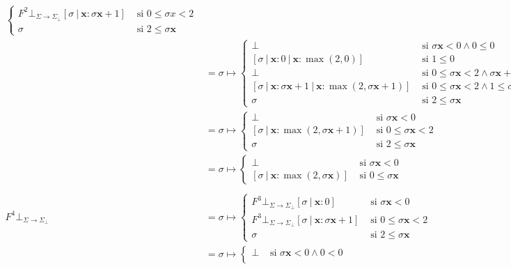 \documentclass{article}
\newcommand{\x}{\textbf{x}}
\newcommand{\cdom}{\Sigma \to \Sigma_\bot}
\newcommand{\cfbot}{\bot_{\cdom}}
\begin{document}
\begin{equation*}
\begin{aligned}
\begin{cases}
                   F^2 \cfbot [\sigma\ |\ \x : \sigma \x + 1] &\text{ si }0 \leq \sigma x < 2 \\ 
                   \sigma &\text{ si }2 \leq \sigma \x
                 \end{cases} \\ 
                 &= \sigma \mapsto \begin{cases}
                   \bot &\text{ si }\sigma \x < 0 \land 0 \leq 0 \\ 
                   [\sigma\ |\ \x : 0\ |\ \x : \max(2, 0)] &\text{ si }1 \leq 0 \\ 
                   \bot &\text{ si } 0 \leq \sigma \x < 2 \land \sigma \x + 1 \leq 0 \\ 
                   [\sigma\ |\ \x : \sigma \x + 1\ |\ \x : \max(2, \sigma \x + 1)] &\text{ si }0 \leq \sigma \x < 2 \land 1 \leq \sigma \x + 1 \\ 
                   \sigma &\text{ si }2 \leq \sigma \x
                 \end{cases} \\ 
                 &= \sigma \mapsto \begin{cases}
                   \bot &\text{ si }\sigma \x < 0 \\ 
                   [\sigma\ |\ \x : \max(2, \sigma \x + 1)] &\text{ si }0 \leq \sigma \x < 2 \\ 
                   \sigma &\text{ si }2 \leq \sigma \x
                 \end{cases} \\ 
                 &= \sigma \mapsto \begin{cases}
                   \bot &\text{ si } \sigma \x < 0 \\ 
                   [\sigma\ |\ \x : \max(2, \sigma \x)] &\text{ si }0 \leq \sigma \x
                 \end{cases} \\ 
                 \\ 
      F^4 \cfbot &= \sigma \mapsto \begin{cases}
        F^3 \cfbot [\sigma\ |\ \x : 0]&\text{ si }\sigma \x < 0 \\ 
        F^3 \cfbot [\sigma\ |\ \x:\sigma\x+1]&\text{ si }0\leq\sigma\x<2 \\ 
        \sigma&\text{ si }2\leq\sigma\x
      \end{cases} \\ 
                 &= \sigma \mapsto \begin{cases}
                   \bot&\text{ si }\sigma\x<0 \land 0<0 \\ 

\end{cases}
\end{aligned}
\end{equation*}
\end{document}
